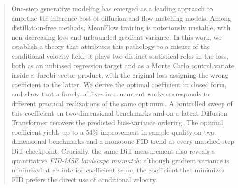 \begin{abstract}
    \label{sec: abstract}
    One-step generative modeling has emerged as a leading approach to amortize the inference cost of diffusion and flow-matching models. Among distillation-free methods, MeanFlow training is notoriously unstable, with non-decreasing loss and unbounded gradient variance. In this work, we establish a theory that attributes this pathology to a misuse of the conditional velocity field: it plays two distinct statistical roles in the loss, both as an unbiased regression target and as a Monte Carlo control variate inside a Jacobi-vector product, with the original loss assigning the wrong coefficient to the latter. We derive the optimal coefficient in closed form, and show that a family of fixes in concurrent works corresponds to different practical realizations of the same optimum. A controlled sweep of this coefficient on two-dimensional benchmarks and on a latent Diffusion Transformer recovers the predicted bias-variance ordering. The optimal coefficient yields up to a $54\%$ improvement in sample quality on two-dimensional benchmarks and a monotone FID trend at every matched-step DiT checkpoint. Crucially, the same DiT measurement also reveals a quantitative \emph{FID-MSE landscape mismatch}: although gradient variance is minimized at an interior coefficient value, the coefficient that minimizes FID prefers the direct use of conditional velocity.
\end{abstract}

